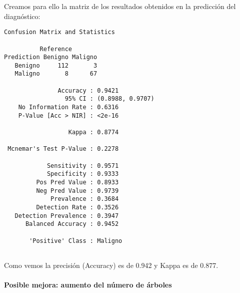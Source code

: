 \documentclass[
]{article}
\newenvironment{Shaded}{\begin{snugshade}}{\end{snugshade}}
\newcommand{\DataTypeTok}[1]{\textcolor[rgb]{0.13,0.29,0.53}{#1}}
\newcommand{\KeywordTok}[1]{\textcolor[rgb]{0.13,0.29,0.53}{\textbf{#1}}}
\newcommand{\NormalTok}[1]{#1}
\newcommand{\OperatorTok}[1]{\textcolor[rgb]{0.81,0.36,0.00}{\textbf{#1}}}
\newcommand{\StringTok}[1]{\textcolor[rgb]{0.31,0.60,0.02}{#1}}
\let\oldparagraph\paragraph
\renewcommand{\paragraph}[1]{\oldparagraph{#1}\mbox{}}
\begin{document}
Creamos para ello la matriz de los resultados obtenidos en la predicción
del diagnóstico:

\begin{Shaded}
\end{Shaded}

\begin{verbatim}
Confusion Matrix and Statistics

          Reference
Prediction Benigno Maligno
   Benigno     112       3
   Maligno       8      67
                                          
               Accuracy : 0.9421          
                 95% CI : (0.8988, 0.9707)
    No Information Rate : 0.6316          
    P-Value [Acc > NIR] : <2e-16          
                                          
                  Kappa : 0.8774          
                                          
 Mcnemar's Test P-Value : 0.2278          
                                          
            Sensitivity : 0.9571          
            Specificity : 0.9333          
         Pos Pred Value : 0.8933          
         Neg Pred Value : 0.9739          
             Prevalence : 0.3684          
         Detection Rate : 0.3526          
   Detection Prevalence : 0.3947          
      Balanced Accuracy : 0.9452          
                                          
       'Positive' Class : Maligno         
                                          
\end{verbatim}

Como vemos la precisión (Accuracy) es de 0.942 y Kappa es de 0.877.

\hypertarget{posible-mejora-aumento-del-nuxfamero-de-uxe1rboles}{%
\paragraph{Posible mejora: aumento del número de
árboles}\label{posible-mejora-aumento-del-nuxfamero-de-uxe1rboles}}
\end{document}
